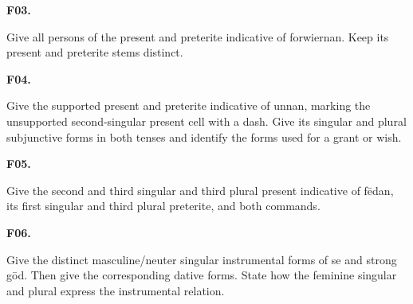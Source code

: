 \par\begin{minipage}{\linewidth}\raggedright
\textbf{F03.}

Give all persons of the present and preterite indicative of forwiernan. Keep its present and preterite stems distinct.

\end{minipage}\par\addvspace{4pt}

\par\begin{minipage}{\linewidth}\raggedright
\textbf{F04.}

Give the supported present and preterite indicative of unnan, marking the unsupported second-singular present cell with a dash. Give its singular and plural subjunctive forms in both tenses and identify the forms used for a grant or wish.

\end{minipage}\par\addvspace{4pt}

\par\begin{minipage}{\linewidth}\raggedright
\textbf{F05.}

Give the second and third singular and third plural present indicative of fēdan, its first singular and third plural preterite, and both commands.

\end{minipage}\par\addvspace{4pt}

\par\begin{minipage}{\linewidth}\raggedright
\textbf{F06.}

Give the distinct masculine/\allowbreak{}neuter singular instrumental forms of se and strong gōd. Then give the corresponding dative forms. State how the feminine singular and plural express the instrumental relation.

\end{minipage}\par\addvspace{4pt}

